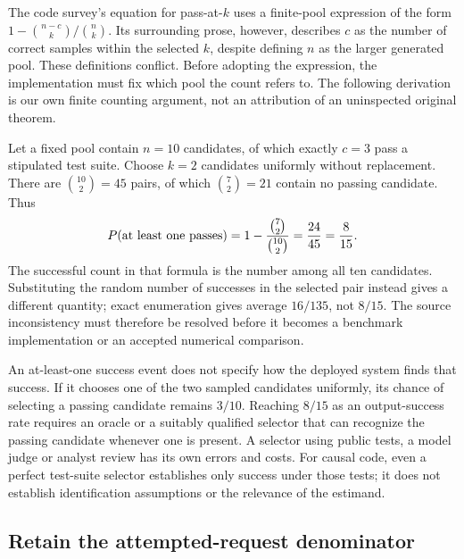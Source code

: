 The code survey's equation for pass-at-$k$ uses a finite-pool expression of the
form $1-\binom{n-c}{k}/\binom{n}{k}$. Its surrounding prose, however, describes
$c$ as the number of correct samples within the selected $k$, despite defining
$n$ as the larger generated pool. These definitions conflict. Before adopting
the expression, the implementation must fix which pool the count refers to.
The following derivation is our own finite counting argument, not an attribution
of an uninspected original theorem.\citep{exec19_surveys_code}

Let a fixed pool contain $n=10$ candidates, of which exactly $c=3$ pass a
stipulated test suite. Choose $k=2$ candidates uniformly without replacement.
There are $\binom{10}{2}=45$ pairs, of which $\binom72=21$ contain no passing
candidate. Thus
\begin{equation}
 P(\hbox{at least one passes})
 =1-\frac{\binom72}{\binom{10}2}=\frac{24}{45}=\frac8{15}.
 \label{exec19:evalcode-pool}
\end{equation}
The successful count in that formula is the number among all ten candidates.
Substituting the random number of successes in the selected pair instead gives
a different quantity; exact enumeration gives average $16/135$, not $8/15$.
The source inconsistency must therefore be resolved before it becomes a
benchmark implementation or an accepted numerical comparison.
\citep{exec19_surveys_reference}

An at-least-one success event does not specify how the deployed system finds
that success. If it chooses one of the two sampled candidates uniformly,
its chance of selecting a passing candidate remains $3/10$. Reaching $8/15$
as an output-success rate requires an oracle or a suitably qualified selector
that can recognize the passing candidate whenever one is present. A selector
using public tests, a model judge or analyst review has its own errors and
costs. For causal code, even a perfect test-suite selector establishes only
success under those tests; it does not establish identification assumptions or
the relevance of the estimand.\citep{exec19_surveys_reference}

\subsection{Retain the attempted-request denominator}
\label{exec19:evalcode-pipeline}

